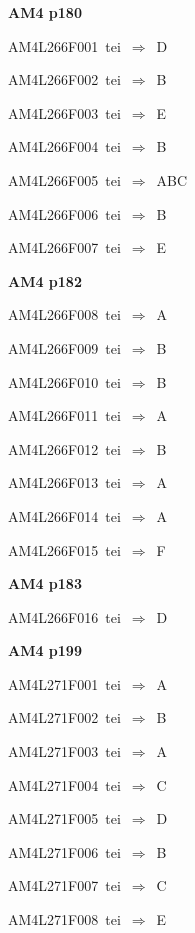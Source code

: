 \par\vfill\eject
{\bf\hfill AM4 p180\hfill\hbox{}}\par\bigskip
{\sixrm AM4L266F001\ {\sixit tei}\ }$\Rightarrow$\ D\par\smallskip
{\sixrm AM4L266F002\ {\sixit tei}\ }$\Rightarrow$\ B\par\smallskip
{\sixrm AM4L266F003\ {\sixit tei}\ }$\Rightarrow$\ E\par\smallskip
{\sixrm AM4L266F004\ {\sixit tei}\ }$\Rightarrow$\ B\par\smallskip
{\sixrm AM4L266F005\ {\sixit tei}\ }$\Rightarrow$\ ABC\par\smallskip
{\sixrm AM4L266F006\ {\sixit tei}\ }$\Rightarrow$\ B\par\smallskip
{\sixrm AM4L266F007\ {\sixit tei}\ }$\Rightarrow$\ E\par\smallskip

\par\vfill\eject
{\bf\hfill AM4 p182\hfill\hbox{}}\par\bigskip
{\sixrm AM4L266F008\ {\sixit tei}\ }$\Rightarrow$\ A\par\smallskip
{\sixrm AM4L266F009\ {\sixit tei}\ }$\Rightarrow$\ B\par\smallskip
{\sixrm AM4L266F010\ {\sixit tei}\ }$\Rightarrow$\ B\par\smallskip
{\sixrm AM4L266F011\ {\sixit tei}\ }$\Rightarrow$\ A\par\smallskip
{\sixrm AM4L266F012\ {\sixit tei}\ }$\Rightarrow$\ B\par\smallskip
{\sixrm AM4L266F013\ {\sixit tei}\ }$\Rightarrow$\ A\par\smallskip
{\sixrm AM4L266F014\ {\sixit tei}\ }$\Rightarrow$\ A\par\smallskip
{\sixrm AM4L266F015\ {\sixit tei}\ }$\Rightarrow$\ {\tenit F}\par\smallskip

\par\vfill\eject
{\bf\hfill AM4 p183\hfill\hbox{}}\par\bigskip
{\sixrm AM4L266F016\ {\sixit tei}\ }$\Rightarrow$\ {\tenit D}\par\smallskip

\par\vfill\eject
{\bf\hfill AM4 p199\hfill\hbox{}}\par\bigskip
{\sixrm AM4L271F001\ {\sixit tei}\ }$\Rightarrow$\ A\par\smallskip
{\sixrm AM4L271F002\ {\sixit tei}\ }$\Rightarrow$\ B\par\smallskip
{\sixrm AM4L271F003\ {\sixit tei}\ }$\Rightarrow$\ A\par\smallskip
{\sixrm AM4L271F004\ {\sixit tei}\ }$\Rightarrow$\ C\par\smallskip
{\sixrm AM4L271F005\ {\sixit tei}\ }$\Rightarrow$\ D\par\smallskip
{\sixrm AM4L271F006\ {\sixit tei}\ }$\Rightarrow$\ B\par\smallskip
{\sixrm AM4L271F007\ {\sixit tei}\ }$\Rightarrow$\ C\par\smallskip
{\sixrm AM4L271F008\ {\sixit tei}\ }$\Rightarrow$\ E\par\smallskip

